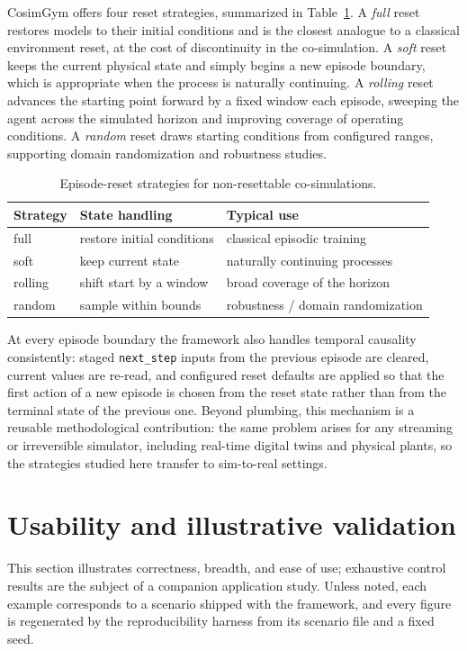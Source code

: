 \documentclass[preprint,12pt]{elsarticle}
\begin{document}
CosimGym offers four reset strategies, summarized in Table~\ref{tab:reset}. A
\emph{full} reset restores models to their initial conditions and is the closest
analogue to a classical environment reset, at the cost of discontinuity in the
co-simulation. A \emph{soft} reset keeps the current physical state and simply
begins a new episode boundary, which is appropriate when the process is naturally
continuing. A \emph{rolling} reset advances the starting point forward by a fixed
window each episode, sweeping the agent across the simulated horizon and improving
coverage of operating conditions. A \emph{random} reset draws starting conditions
from configured ranges, supporting domain randomization and robustness studies.

\begin{table}[t]\centering
\caption{Episode-reset strategies for non-resettable co-simulations.}
\label{tab:reset}
\small
\begin{tabular}{@{}lll@{}}
\toprule
Strategy & State handling & Typical use \\
\midrule
full    & restore initial conditions & classical episodic training \\
soft    & keep current state         & naturally continuing processes \\
rolling & shift start by a window     & broad coverage of the horizon \\
random  & sample within bounds        & robustness / domain randomization \\
\bottomrule
\end{tabular}
\end{table}

At every episode boundary the framework also handles temporal causality
consistently: staged \texttt{next\_step} inputs from the previous episode are
cleared, current values are re-read, and configured reset defaults are applied so
that the first action of a new episode is chosen from the reset state rather than
from the terminal state of the previous one. Beyond plumbing, this mechanism is a
reusable methodological contribution: the same problem arises for any streaming or
irreversible simulator, including real-time digital twins and physical plants, so
the strategies studied here transfer to sim-to-real settings.

\section{Usability and illustrative validation}\label{sec:examples}
This section illustrates correctness, breadth, and ease of use; exhaustive control
results are the subject of a companion application study. Unless noted, each
example corresponds to a scenario shipped with the framework, and every figure is
regenerated by the reproducibility harness from its scenario file and a fixed seed.
\end{document}
